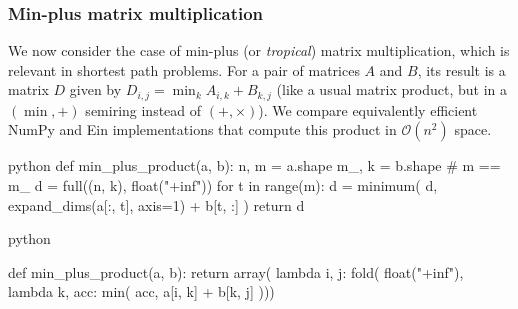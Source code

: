 \subsubsection{Min-plus matrix multiplication}

We now consider the case of min-plus (or \textit{tropical}) matrix multiplication, which is relevant in shortest path problems. For a pair of matrices $A$ and $B$, its result is a matrix $D$ given by $D_{i,j} = \min_{k} A_{i,k} + B_{k,j}$ (like a usual matrix product, but in a $(\min, +)$ semiring instead of $(+, \times)$). We compare equivalently efficient NumPy and Ein implementations that compute this product in $\mathcal O(n^2)$ space.

\begin{center}    
\begin{minipage}[t]{.5\textwidth}
\raggedright
\begin{center}    
\begin{cminted}{python}
def min_plus_product(a, b):
    n,  m = a.shape
    m_, k = b.shape  # m == m_
    d = full((n, k), float("+inf"))
    for t in range(m):
      d = minimum(
        d, 
        expand_dims(a[:, t], axis=1) + b[t, :]
      )
    return d
\end{cminted}
\end{center}
\end{minipage}%
\begin{minipage}[t]{.5\textwidth}
\raggedleft
\begin{center}    
\begin{cminted}{python}

def min_plus_product(a, b):
    return array(
      lambda i, j: fold(
        float("+inf"),
        lambda k, acc: min(
            acc, 
            a[i, k] + b[k, j]
    )))

\end{cminted}
\end{center}
\end{minipage}
\end{center}

